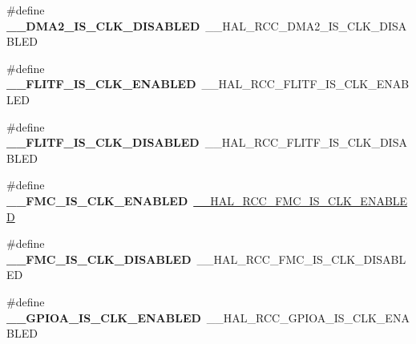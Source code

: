 \begin{DoxyCompactItemize}
\item 
\mbox{\label{group___h_a_l___r_c_c___aliased_ga5343915fc6c9e81fe74c806bac95dc9c}} 
\#define {\bfseries \+\_\+\+\_\+\+D\+M\+A2\+\_\+\+I\+S\+\_\+\+C\+L\+K\+\_\+\+D\+I\+S\+A\+B\+L\+ED}~\+\_\+\+\_\+\+H\+A\+L\+\_\+\+R\+C\+C\+\_\+\+D\+M\+A2\+\_\+\+I\+S\+\_\+\+C\+L\+K\+\_\+\+D\+I\+S\+A\+B\+L\+ED
\item 
\mbox{\label{group___h_a_l___r_c_c___aliased_gaecf13d120c8b030d3b71ad688fd79518}} 
\#define {\bfseries \+\_\+\+\_\+\+F\+L\+I\+T\+F\+\_\+\+I\+S\+\_\+\+C\+L\+K\+\_\+\+E\+N\+A\+B\+L\+ED}~\+\_\+\+\_\+\+H\+A\+L\+\_\+\+R\+C\+C\+\_\+\+F\+L\+I\+T\+F\+\_\+\+I\+S\+\_\+\+C\+L\+K\+\_\+\+E\+N\+A\+B\+L\+ED
\item 
\mbox{\label{group___h_a_l___r_c_c___aliased_ga2421872586051f72784338c03da58492}} 
\#define {\bfseries \+\_\+\+\_\+\+F\+L\+I\+T\+F\+\_\+\+I\+S\+\_\+\+C\+L\+K\+\_\+\+D\+I\+S\+A\+B\+L\+ED}~\+\_\+\+\_\+\+H\+A\+L\+\_\+\+R\+C\+C\+\_\+\+F\+L\+I\+T\+F\+\_\+\+I\+S\+\_\+\+C\+L\+K\+\_\+\+D\+I\+S\+A\+B\+L\+ED
\item 
\mbox{\label{group___h_a_l___r_c_c___aliased_gaefae2949238ac20c67f33302c39bc53e}} 
\#define {\bfseries \+\_\+\+\_\+\+F\+M\+C\+\_\+\+I\+S\+\_\+\+C\+L\+K\+\_\+\+E\+N\+A\+B\+L\+ED}~\mbox{\hyperlink{group___r_c_c_ex___peripheral___clock___enable___disable___status_ga93863872b8bedab2b9714ad82f672f3d}{\+\_\+\+\_\+\+H\+A\+L\+\_\+\+R\+C\+C\+\_\+\+F\+M\+C\+\_\+\+I\+S\+\_\+\+C\+L\+K\+\_\+\+E\+N\+A\+B\+L\+ED}}
\item 
\mbox{\label{group___h_a_l___r_c_c___aliased_gab4d825237a2dcaa1179a16c49ece626c}} 
\#define {\bfseries \+\_\+\+\_\+\+F\+M\+C\+\_\+\+I\+S\+\_\+\+C\+L\+K\+\_\+\+D\+I\+S\+A\+B\+L\+ED}~\+\_\+\+\_\+\+H\+A\+L\+\_\+\+R\+C\+C\+\_\+\+F\+M\+C\+\_\+\+I\+S\+\_\+\+C\+L\+K\+\_\+\+D\+I\+S\+A\+B\+L\+ED
\item 
\mbox{\label{group___h_a_l___r_c_c___aliased_gae1b665ed35a5cbc7919caa954c030fc7}} 
\#define {\bfseries \+\_\+\+\_\+\+G\+P\+I\+O\+A\+\_\+\+I\+S\+\_\+\+C\+L\+K\+\_\+\+E\+N\+A\+B\+L\+ED}~\+\_\+\+\_\+\+H\+A\+L\+\_\+\+R\+C\+C\+\_\+\+G\+P\+I\+O\+A\+\_\+\+I\+S\+\_\+\+C\+L\+K\+\_\+\+E\+N\+A\+B\+L\+ED

\end{DoxyCompactItemize}

